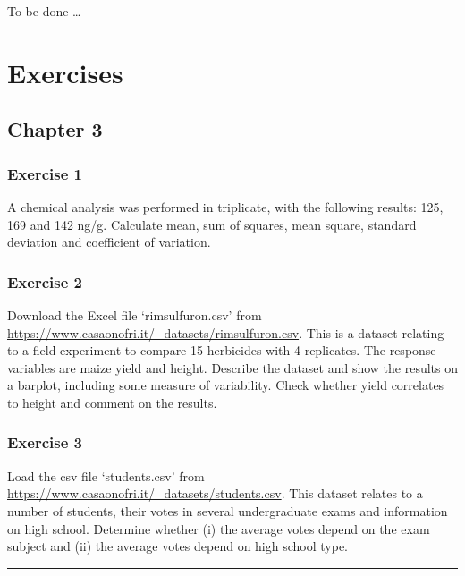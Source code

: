 \documentclass[a4paper,12pt,oneside]{book}
\begin{document}
To be done \ldots{}

\hypertarget{exercises}{%
\chapter{Exercises}\label{exercises}}

\hypertarget{chapter-3}{%
\section{Chapter 3}\label{chapter-3}}

\hypertarget{exercise-1}{%
\subsection{Exercise 1}\label{exercise-1}}

A chemical analysis was performed in triplicate, with the following results: 125, 169 and 142 ng/g. Calculate mean, sum of squares, mean square, standard deviation and coefficient of variation.

\hypertarget{exercise-2}{%
\subsection{Exercise 2}\label{exercise-2}}

Download the Excel file `rimsulfuron.csv' from \url{https://www.casaonofri.it/_datasets/rimsulfuron.csv}. This is a dataset relating to a field experiment to compare 15 herbicides with 4 replicates. The response variables are maize yield and height. Describe the dataset and show the results on a barplot, including some measure of variability. Check whether yield correlates to height and comment on the results.

\hypertarget{exercise-3}{%
\subsection{Exercise 3}\label{exercise-3}}

Load the csv file `students.csv' from \url{https://www.casaonofri.it/_datasets/students.csv}. This dataset relates to a number of students, their votes in several undergraduate exams and information on high school. Determine whether (i) the average votes depend on the exam subject and (ii) the average votes depend on high school type.

\begin{center}\rule{0.5\linewidth}{0.5pt}\end{center}
\end{document}

